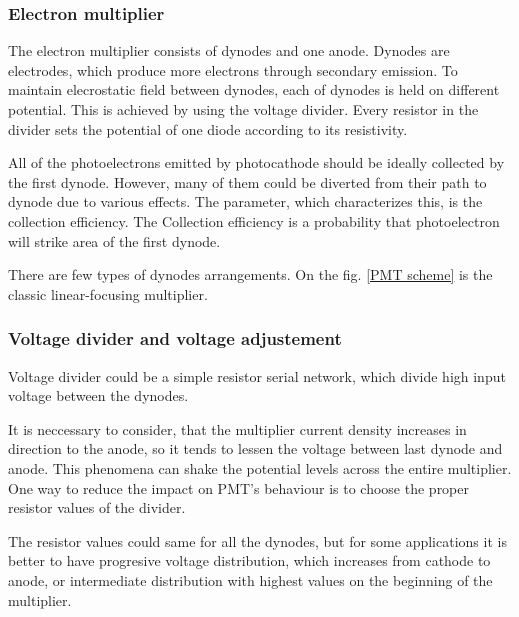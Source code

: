 \subsubsection{Electron multiplier}
The electron multiplier consists of dynodes and one anode.
Dynodes are electrodes, which produce more electrons through secondary emission. To maintain elecrostatic field between dynodes, each of dynodes is held on different potential. This is achieved by using the voltage divider. Every resistor in the divider sets the potential of one diode according to its resistivity.
\par
All of the photoelectrons emitted by photocathode should be ideally collected by the first dynode. However, many of them could be diverted from their path to dynode due to various effects. The parameter, which characterizes this, is the collection efficiency. The Collection efficiency is a probability that photoelectron will strike area of the first dynode. 
\par
There are few types of dynodes arrangements. On the fig. \ref{PMT scheme} is the classic linear-focusing multiplier. 


\subsubsection{Voltage divider and voltage adjustement}
Voltage divider could be a simple resistor serial network, which divide high input voltage between the dynodes. 
\par
It is neccessary to consider, that the multiplier current density increases in direction to the anode, so it tends to lessen the voltage between last dynode and anode. This phenomena can shake the potential levels across the entire multiplier. One way to reduce the impact on PMT's behaviour is to choose the proper resistor values of the divider. 
\par
The resistor values could same for all the dynodes, but for some applications it is better to have progresive voltage distribution, which increases from cathode to anode, or intermediate distribution with highest values on the beginning of the multiplier.

